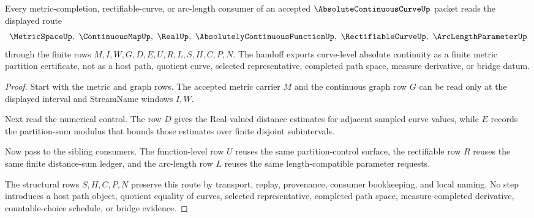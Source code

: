 \begin{theorem}
\label{thm:absolute-continuous-curve-metric-length-handoff}
Every metric-completion, rectifiable-curve, or arc-length consumer of an accepted $\AbsoluteContinuousCurveUp$ packet reads the displayed route
$$
\MetricSpaceUp,\ \ContinuousMapUp,\ \RealUp,\ \AbsolutelyContinuousFunctionUp,\ \RectifiableCurveUp,\ \ArcLengthParameterUp
$$
through the finite rows $M,I,W,G,D,E,U,R,L,S,H,C,P,N$. The handoff exports curve-level absolute continuity as a finite metric partition certificate, not as a host path, quotient curve, selected representative, completed path space, measure derivative, or bridge datum.
\end{theorem}
\begin{proof}
Start with the metric and graph rows. The accepted metric carrier $M$ and the continuous graph row $G$ can be read only at the displayed interval and StreamName windows $I,W$.

Next read the numerical control. The row $D$ gives the Real-valued distance estimates for adjacent sampled curve values, while $E$ records the partition-sum modulus that bounds those estimates over finite disjoint subintervals.

Now pass to the sibling consumers. The function-level row $U$ reuses the same partition-control surface, the rectifiable row $R$ reuses the same finite distance-sum ledger, and the arc-length row $L$ reuses the same length-compatible parameter requests.

The structural rows $S,H,C,P,N$ preserve this route by transport, replay, provenance, consumer bookkeeping, and local naming. No step introduces a host path object, quotient equality of curves, selected representative, completed path space, measure-completed derivative, countable-choice schedule, or bridge evidence.
\end{proof}


